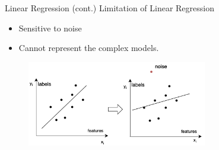 \documentclass[aspectratio=1610]{beamer}
\begin{document}
\begin{frame}{Linear Regression (cont.)}
    Limitation of Linear Regression
    \begin{itemize}
        \item Sensitive to noise
        \item Cannot represent the complex models.
    \end{itemize}
    \begin{figure}[h!]
  \includegraphics[width=0.7\textwidth]{Screen Shot 2022-05-21 at 18.04.04.png}
\end{figure}
\end{frame}

\iffalse
\end{document}
